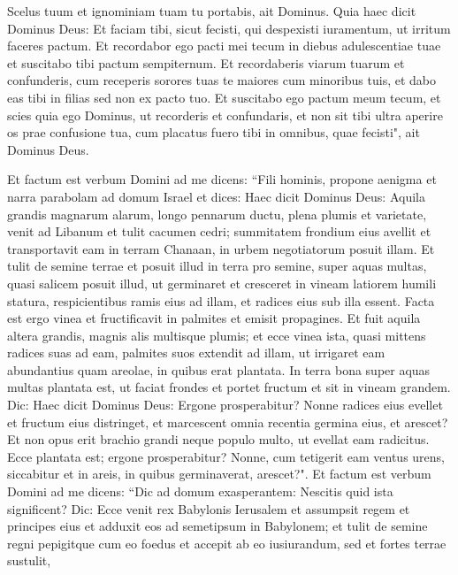 \begin{biblechapter}
\verse Scelus tuum et ignominiam tuam tu portabis, ait Dominus. 
\verse Quia haec dicit Dominus Deus: Et faciam tibi, sicut fecisti, qui despexisti iuramentum, ut irritum faceres pactum. 
\verse Et recordabor ego pacti mei tecum in diebus adulescentiae tuae et suscitabo tibi pactum sempiternum. 
\verse Et recordaberis viarum tuarum et confunderis, cum receperis sorores tuas te maiores cum minoribus tuis, et dabo eas tibi in filias sed non ex pacto tuo. 
\verse Et suscitabo ego pactum meum tecum, et scies quia ego Dominus, 
\verse ut recorderis et confundaris, et non sit tibi ultra aperire os prae confusione tua, cum placatus fuero tibi in omnibus, quae fecisti", ait Dominus Deus. 
\end{biblechapter}

\begin{biblechapter}  
\verse Et factum est verbum Domini ad me dicens: 
\verse “Fili hominis, propone aenigma et narra parabolam ad domum Israel 
\verse et dices: Haec dicit Dominus Deus: Aquila grandis magnarum alarum, longo pennarum ductu, plena plumis et varietate, venit ad Libanum et tulit cacumen cedri; 
\verse summitatem frondium eius avellit et transportavit eam in terram Chanaan, in urbem negotiatorum posuit illam. 
\verse Et tulit de semine terrae et posuit illud in terra pro semine, super aquas multas, quasi salicem posuit illud, 
\verse ut germinaret et cresceret in vineam latiorem humili statura, respicientibus ramis eius ad illam, et radices eius sub illa essent. Facta est ergo vinea et fructificavit in palmites et emisit propagines. 
\verse Et fuit aquila altera grandis, magnis alis multisque plumis; et ecce vinea ista, quasi mittens radices suas ad eam, palmites suos extendit ad illam, ut irrigaret eam abundantius quam areolae, in quibus erat plantata. 
\verse In terra bona super aquas multas plantata est, ut faciat frondes et portet fructum et sit in vineam grandem. 
\verse Dic: Haec dicit Dominus Deus: Ergone prosperabitur? Nonne radices eius evellet et fructum eius distringet, et marcescent omnia recentia germina eius, et arescet? Et non opus erit brachio grandi neque populo multo, ut evellat eam radicitus. 
\verse Ecce plantata est; ergone prosperabitur? Nonne, cum tetigerit eam ventus urens, siccabitur et in areis, in quibus germinaverat, arescet?". 
\verse Et factum est verbum Domini ad me dicens: 
\verse “Dic ad domum exasperantem: Nescitis quid ista significent? Dic: Ecce venit rex Babylonis Ierusalem et assumpsit regem et principes eius et adduxit eos ad semetipsum in Babylonem;  
\verse et tulit de semine regni pepigitque cum eo foedus et accepit ab eo iusiurandum, sed et fortes terrae sustulit, 

\end{biblechapter}
